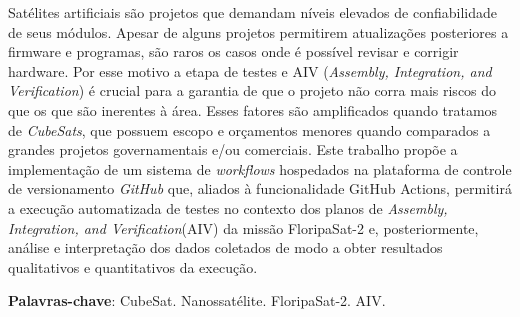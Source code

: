 



\setlength{\absparsep}{18pt} %
\begin{resumo}
	\SingleSpacing
	Satélites artificiais são projetos que demandam níveis elevados de confiabilidade de seus módulos.
	Apesar de alguns projetos permitirem atualizações posteriores a firmware e programas,
	são raros os casos onde é possível revisar e corrigir hardware.
	Por esse motivo a etapa de testes e AIV (\textit{Assembly, Integration, and Verification}) é crucial
	para a garantia de que o projeto não corra mais riscos do que os que são inerentes à área.
	Esses fatores são amplificados quando tratamos de \textit{CubeSats}, que possuem escopo e orçamentos
	menores quando comparados a grandes projetos governamentais e/ou comerciais.
	Este trabalho propõe a implementação de um sistema de \textit{workflows} hospedados na plataforma de
	controle de versionamento \textit{GitHub} que, aliados à funcionalidade GitHub Actions, permitirá a
	execução automatizada de testes no contexto dos planos de
	\emph{Assembly, Integration, and Verification}(AIV) da missão FloripaSat-2 e, posteriormente, análise
	e interpretação dos dados coletados de modo a obter resultados qualitativos e quantitativos da execução.


	\textbf{Palavras-chave}: CubeSat. Nanossatélite. FloripaSat-2. AIV.
\end{resumo}

